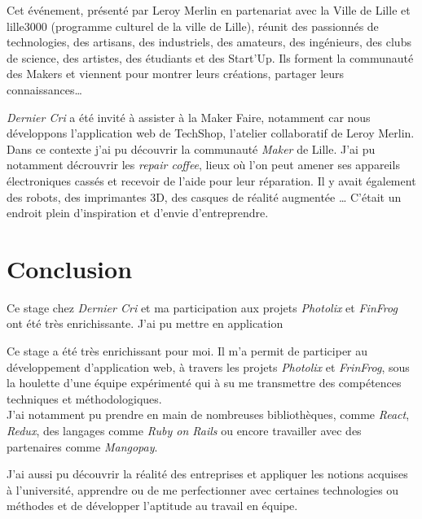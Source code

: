 \documentclass[12pt,a4paper]{article}
\begin{document}
  \bigskip

  Cet événement, présenté par Leroy Merlin en partenariat avec la Ville de
  Lille et lille3000 (programme culturel de la ville de Lille), réunit des
  passionnés de technologies, des artisans, des industriels, des amateurs,
  des ingénieurs, des clubs de science, des artistes, des étudiants et des
  Start'Up. Ils forment la communauté des Makers et viennent pour montrer
  leurs créations, partager leurs connaissances\ldots{}

  \bigskip

  \emph{Dernier Cri} a été invité à assister à la Maker Faire, notamment
  car nous développons l'application web de TechShop, l'atelier
  collaboratif de Leroy Merlin. Dans ce contexte j'ai pu découvrir la
  communauté \emph{Maker} de Lille. J'ai pu notamment décrouvrir les
  \emph{repair coffee}, lieux où l'on peut amener ses appareils
  électroniques cassés et recevoir de l'aide pour leur réparation. Il y
  avait également des robots, des imprimantes 3D, des casques de réalité
  augmentée \ldots{} C'était un endroit plein d'inspiration et d'envie
  d'entreprendre.

  \newpage

  \section{Conclusion}\label{conclusion-2}

  Ce stage chez \emph{Dernier Cri} et ma participation aux projets
  \emph{Photolix} et \emph{FinFrog} ont été très enrichissante. J'ai pu
  mettre en application

  \bigskip

  Ce stage a été très enrichissant pour moi. Il m'a permit de participer
  au développement d'application web, à travers les projets
  \emph{Photolix} et \emph{FrinFrog}, sous la houlette d'une équipe
  expérimenté qui à su me transmettre des compétences techniques et
  méthodologiques.\\
  J'ai notamment pu prendre en main de nombreuses bibliothèques, comme
  \emph{React}, \emph{Redux}, des langages comme \emph{Ruby on Rails} ou
  encore travailler avec des partenaires comme \emph{Mangopay}.

  \bigskip

  J'ai aussi pu découvrir la réalité des entreprises et appliquer les
  notions acquises à l'université, apprendre ou de me perfectionner avec
  certaines technologies ou méthodes et de développer l'aptitude au
  travail en équipe.
\end{document}
